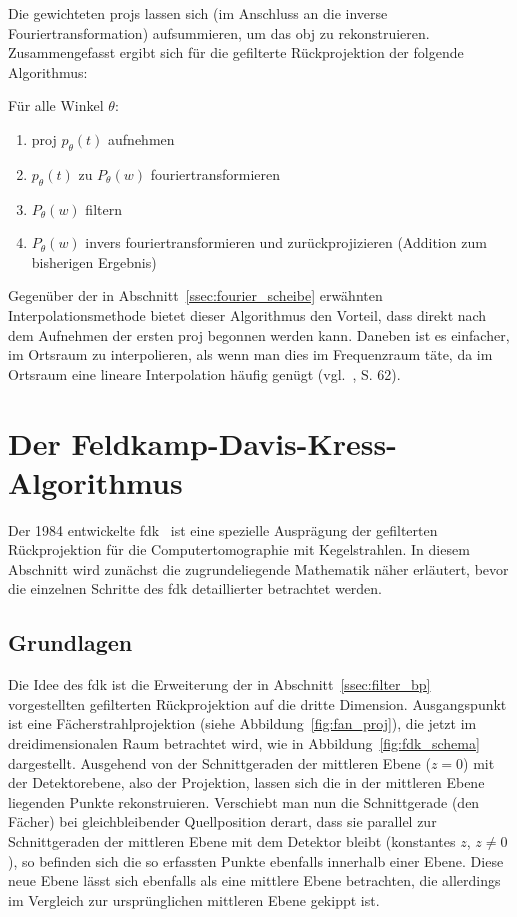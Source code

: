 Die gewichteten \glspl{proj} lassen sich (im Anschluss an die inverse Fouriertransformation) aufsummieren, um das
\gls{obj} zu rekonstruieren. Zusammengefasst ergibt sich für die gefilterte Rückprojektion der folgende Algorithmus:

Für alle Winkel $\theta$:
\begin{enumerate}
    \item \gls{proj} $p_{\theta}(t)$ aufnehmen
    \item $p_{\theta}(t)$ zu $P_{\theta}(w)$ fouriertransformieren
    \item $P_{\theta}(w)$ filtern
    \item $P_{\theta}(w)$ invers fouriertransformieren und zurückprojizieren (Addition zum bisherigen Ergebnis)
\end{enumerate}

Gegenüber der in Abschnitt~\ref{ssec:fourier_scheibe} erwähnten Interpolationsmethode bietet dieser Algorithmus den
Vorteil, dass direkt nach dem Aufnehmen der ersten \gls{proj} begonnen werden kann. Daneben ist es einfacher, im
Ortsraum zu interpolieren, als wenn man dies im Frequenzraum täte, da im Ortsraum eine lineare Interpolation häufig
genügt (vgl.~\cite{kakslan}, S. 62).

\section{Der Feldkamp-Davis-Kress-Algorithmus}\label{sec:fdk}

Der 1984 entwickelte \gls{fdk}~\cite{fdk} ist eine spezielle Ausprägung der gefilterten Rückprojektion für die
Computertomographie mit Kegelstrahlen. In diesem Abschnitt wird zunächst die zugrundeliegende Mathematik näher
erläutert, bevor die einzelnen Schritte des \gls{fdk} detaillierter betrachtet werden.

\subsection{Grundlagen}\label{ssec:fdk_math}

Die Idee des \gls{fdk} ist die Erweiterung der in Abschnitt~\ref{ssec:filter_bp} vorgestellten gefilterten
Rückprojektion auf die dritte Dimension. Ausgangspunkt ist eine Fächerstrahlprojektion (siehe
Abbildung~\ref{fig:fan_proj}), die jetzt im dreidimensionalen Raum betrachtet wird, wie in
Abbildung~\ref{fig:fdk_schema} dargestellt. Ausgehend von der Schnittgeraden der mittleren Ebene ($z = 0$) mit der
Detektorebene, also der Projektion, lassen sich die in der mittleren Ebene liegenden Punkte rekonstruieren. Verschiebt
man nun die Schnittgerade (den Fächer) bei gleichbleibender Quellposition derart, dass sie parallel zur Schnittgeraden
der mittleren Ebene mit dem Detektor bleibt (konstantes $z$, $z \neq 0$), so befinden sich die so erfassten Punkte
ebenfalls innerhalb einer Ebene. Diese neue Ebene lässt sich ebenfalls als eine mittlere Ebene betrachten, die
allerdings im Vergleich zur {\glqq}ursprünglichen{\grqq} mittleren Ebene gekippt ist.

